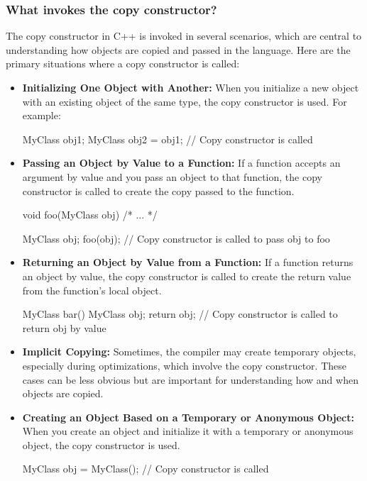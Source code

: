 \documentclass{report}
\begin{document}
    \pagebreak 
    \subsubsection{What invokes the copy constructor?}
    \bigbreak \noindent 
    The copy constructor in C++ is invoked in several scenarios, which are central to understanding how objects are copied and passed in the language. Here are the primary situations where a copy constructor is called:
    \begin{itemize}
        \item \textbf{Initializing One Object with Another:} When you initialize a new object with an existing object of the same type, the copy constructor is used. For example:
            \bigbreak \noindent 
            \begin{cppcode}
            MyClass obj1;
            MyClass obj2 = obj1; // Copy constructor is called
            \end{cppcode}
        \item \textbf{Passing an Object by Value to a Function:} If a function accepts an argument by value and you pass an object to that function, the copy constructor is called to create the copy passed to the function.
            \bigbreak \noindent 
            \begin{cppcode}
            void foo(MyClass obj) { /* ... */ }

            MyClass obj;
            foo(obj); // Copy constructor is called to pass obj to foo
            \end{cppcode}
        \item \textbf{Returning an Object by Value from a Function:} If a function returns an object by value, the copy constructor is called to create the return value from the function's local object.
            \bigbreak \noindent 
            \begin{cppcode}
            MyClass bar() {
                MyClass obj;
                return obj; // Copy constructor is called to return obj by value
            }
            \end{cppcode}
        \item \textbf{Implicit Copying:} Sometimes, the compiler may create temporary objects, especially during optimizations, which involve the copy constructor. These cases can be less obvious but are important for understanding how and when objects are copied.
        \item \textbf{Creating an Object Based on a Temporary or Anonymous Object:} When you create an object and initialize it with a temporary or anonymous object, the copy constructor is used.
            \bigbreak \noindent 
            \begin{cppcode}
            MyClass obj = MyClass(); // Copy constructor is called
            \end{cppcode}
    \end{itemize}
\end{document}

